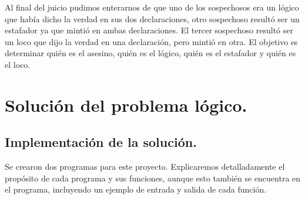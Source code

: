 \documentclass[letterpaper,12pt]{article}
\begin{document}
    Al final del juicio pudimos enterarnos de que uno de los sospechosos era un
    lógico que había dicho la verdad en sus dos declaraciones, otro sospechoso
    resultó ser un estafador ya que mintió en ambas declaraciones. El tercer 
    sospechoso resultó ser un loco que dijo la verdad en una declaración, pero 
    mintió en otra.
    El objetivo es determinar quién es el asesino, quién es el lógico, quién es
    el estafador y quién es el loco.

    \section{Solución del problema lógico.}
    \subsection{Implementación de la solución.}
    Se crearon dos programas para este proyecto. Explicaremos detalladamente el 
    propósito de cada programa y sus funciones, aunque esto también se 
    encuentra en el programa, incluyendo un ejemplo de entrada y salida de 
    cada función.
\end{document}
